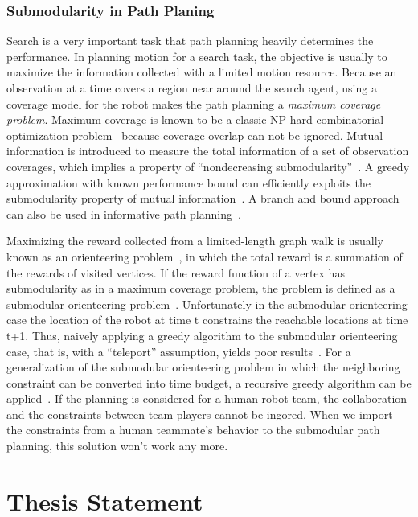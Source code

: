 \documentclass[phd]{byuprop}
\begin{document}
\subsubsection{Submodularity in Path Planing}
\label{sec:related_work:algorithm_specific_work:submodularity_in_path_planning}

Search is a very important task that path planning heavily determines the performance.
In planning motion for a search task, the objective is usually to maximize the information collected with a limited motion resource.
Because an observation at a time covers a region near around the search agent, using a coverage model for the robot makes the path planning a {\em maximum coverage problem}.
Maximum coverage is known to be a classic NP-hard combinatorial optimization problem~\cite{Megiddo1983} because coverage overlap can not be ignored. 
Mutual information is introduced to measure the total information
of a set of observation coverages, which implies a property of
“nondecreasing submodularity”~\cite{Singh2009}. 
A greedy approximation with known performance bound can efficiently exploits the submodularity property of mutual information~\cite{Singh2009}. 
A branch and bound approach can also be used in informative path
planning~\cite{Binney2012}.

Maximizing the reward collected from a limited-length graph walk is usually known as an orienteering problem~\cite{Vansteenwegen2011}, in which the total reward is a summation of the rewards of visited vertices. 
If the reward function of a vertex has submodularity as in a maximum coverage problem, the problem is defined as a submodular orienteering problem~\cite{Chekuri2005}. 
Unfortunately in the submodular orienteering case the location of the robot at time t constrains the reachable locations at time t+1.
Thus, naively applying a greedy algorithm to the submodular orienteering case, that is, with a “teleport” assumption, yields poor results~\cite{Krause2012}. 
For a generalization of the submodular orienteering problem in which the neighboring constraint can be converted into time budget, a recursive greedy algorithm can be applied~\cite{Chekuri2005}.
If the planning is considered for a human-robot team, the collaboration and the constraints between team players cannot be ingored.
When we import the constraints from a human teammate's behavior to the submodular path planning, this solution won't work any more. 


\section{Thesis Statement}
\label{sec:thesis_statement}
\end{document}
